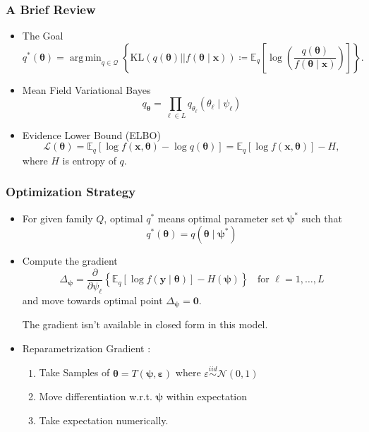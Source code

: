\documentclass[aspectratio=169,10pt,notes]{beamer}
\DeclareMathOperator*{\argmin}{arg\,min}
\begin{document}
\begin{frame}
    \frametitle{A Brief Review}
    \label{exapg:variationalinferencereview}
    \begin{itemize}
    \item The Goal
        \[
            q^*(\bm{\theta}) = \argmin_{q\in\mathcal{Q}}\left\lbrace
            \text{KL}\left(q(\bm{\theta})||f(\bm{\theta}\mid\bm{x})\right) 
            \coloneqq
            \mathbb{E}_{q}\left[\log\left(
            \frac{q(\bm{\theta})}{f(\bm{\theta}\mid\bm{x})}
            \right)\right]
            \right\rbrace.
        \]
    \item Mean Field Variational Bayes
        \[
            q_{\bm{\theta}} = \prod_{\ell \in L}
                q_{\theta_{\ell}}(\theta_{\ell}\mid\psi_{\ell})
        \]
    \item Evidence Lower Bound (ELBO)
        \[
            \mathcal{L}(\bm{\theta}) = 
                \mathbb{E}_q\left[\log f(\bm{x},\bm{\theta}) - 
                \log q(\bm{\theta})\right] 
            = \mathbb{E}_q[\log f(\bm{x},\bm{\theta})] - H,
        \]
    where $H$ is entropy of $q$.
    \end{itemize}
\end{frame} %

\begin{frame}
    \frametitle{Optimization Strategy}
    \begin{itemize}
    \item For given family $Q$, optimal $q^*$ means optimal parameter set 
        $\bm{\psi}^*$ such that
        \[
            q^*(\bm{\theta}) = q(\bm{\theta}\mid\bm{\psi}^*)
        \]
    \item Compute the gradient
        \[
            \Delta_{\bm{\psi}} = \frac{\partial}{\partial \psi_{\ell}}
                \left\lbrace\mathbb{E}_{q}\left[\log f(\bm{y}\mid\bm{\theta})\right] 
                    - H(\bm{\psi})\right\rbrace
                \;\;\text{ for }\ell = 1,\ldots,L
        \]
    and move towards optimal point $\Delta_{\bm{\psi}} = \bm{0}$.

    The gradient isn't available in closed form in this model.
    \item Reparametrization Gradient \cite{kingma2022}:
        \begin{enumerate}
            \item Take Samples of $\bm{\theta} = T(\bm{\psi}, \bm{\varepsilon})$ 
                where $\varepsilon \stackrel{iid}{\sim} \mathcal{N}(0,1)$
            \item Move differentiation w.r.t. $\bm{\psi}$ within expectation
            \item Take expectation numerically.
        \end{enumerate}
    \end{itemize}
\end{frame} %
\end{document}
